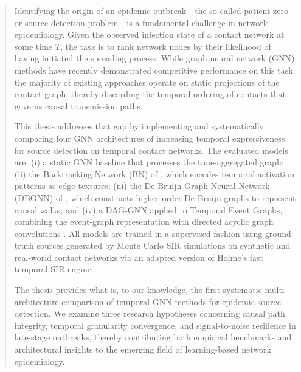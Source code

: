 \begin{abstract}
Identifying the origin of an epidemic outbreak---the so-called patient-zero or
source detection problem---is a fundamental challenge in network epidemiology.
Given the observed infection state of a contact network at some time $T$, the
task is to rank network nodes by their likelihood of having initiated the
spreading process. While graph neural network (GNN) methods have recently
demonstrated competitive performance on this task, the majority of existing
approaches operate on static projections of the contact graph, thereby
discarding the temporal ordering of contacts that governs causal transmission
paths.

This thesis addresses that gap by implementing and systematically comparing
four GNN architectures of increasing temporal expressiveness for source
detection on temporal contact networks. The evaluated models are: (i) a static
GNN baseline that processes the time-aggregated graph; (ii) the Backtracking
Network (BN) of \cite{Ru2023}, which encodes temporal activation patterns as
edge textures; (iii) the De Bruijn Graph Neural Network (DBGNN) of
\cite{Qarkaxhija2022}, which constructs higher-order De Bruijn graphs to
represent causal walks; and (iv) a DAG-GNN applied to Temporal Event Graphs,
combining the event-graph representation with directed acyclic graph
convolutions \cite{Sterchi2025}. All models are trained in a supervised
fashion using ground-truth sources generated by Monte Carlo SIR simulations on
synthetic and real-world contact networks via an adapted version of Holme's
fast temporal SIR engine.

The thesis provides what is, to our knowledge, the first systematic
multi-architecture comparison of temporal GNN methods for epidemic source
detection. We examine three research hypotheses concerning causal path
integrity, temporal granularity convergence, and signal-to-noise resilience in
late-stage outbreaks, thereby contributing both empirical benchmarks and
architectural insights to the emerging field of learning-based network
epidemiology.
\end{abstract}

